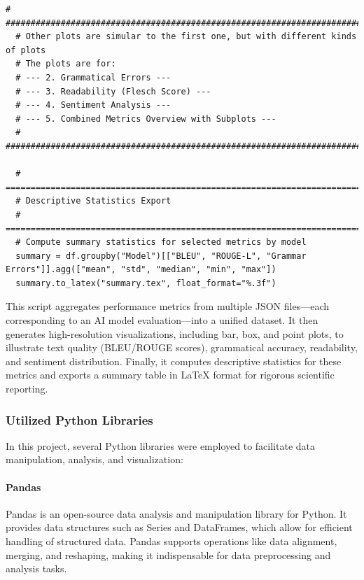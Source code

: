 \begin{lstlisting}[style=Python, caption={Python-qualitative-data-analysis}, captionpos=b]
  # ##############################################################################
  # Other plots are simular to the first one, but with different kinds of plots
  # The plots are for:
  # --- 2. Grammatical Errors ---
  # --- 3. Readability (Flesch Score) ---
  # --- 4. Sentiment Analysis ---
  # --- 5. Combined Metrics Overview with Subplots ---
  # ##############################################################################
  
  # =============================================================================
  # Descriptive Statistics Export
  # =============================================================================
  # Compute summary statistics for selected metrics by model
  summary = df.groupby("Model")[["BLEU", "ROUGE-L", "Grammar Errors"]].agg(["mean", "std", "median", "min", "max"])
  summary.to_latex("summary.tex", float_format="%.3f")  
\end{lstlisting}

This script aggregates performance metrics from multiple JSON files—each corresponding to an AI model evaluation—into a unified dataset. 
It then generates high-resolution visualizations, including bar, box, and point plots, to illustrate text quality (BLEU/ROUGE scores), 
grammatical accuracy, readability, and sentiment distribution. Finally, 
it computes descriptive statistics for these metrics and exports a summary table in LaTeX format for rigorous scientific reporting.

\subsubsection{Utilized Python Libraries}

In this project, several Python libraries were employed to facilitate data manipulation, analysis, and visualization:

\paragraph{Pandas}

Pandas is an open-source data analysis and manipulation library for Python. It provides data structures such as Series and DataFrames, which allow for efficient handling of structured data. Pandas supports operations like data alignment, merging, and reshaping, making it indispensable for data preprocessing and analysis tasks.

\cite{pandas}

